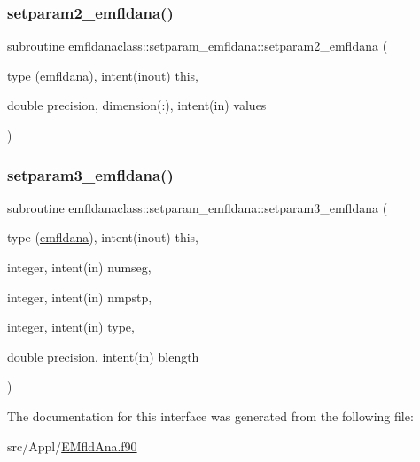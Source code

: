 \mbox{\label{interfaceemfldanaclass_1_1setparam__emfldana_a2a4f3a168c37d3621624b4111867fbe1}} 
\subsubsection{\texorpdfstring{setparam2\_emfldana()}{setparam2\_emfldana()}}
{\footnotesize\ttfamily subroutine emfldanaclass\+::setparam\+\_\+emfldana\+::setparam2\+\_\+emfldana (\begin{DoxyParamCaption}\item[{type (\mbox{\hyperlink{namespaceemfldanaclass_structemfldanaclass_1_1emfldana}{emfldana}}), intent(inout)}]{this,  }\item[{double precision, dimension(\+:), intent(in)}]{values }\end{DoxyParamCaption})}

\mbox{\label{interfaceemfldanaclass_1_1setparam__emfldana_a4e8f06b9117c3766c829eced93c2d474}} 
\subsubsection{\texorpdfstring{setparam3\_emfldana()}{setparam3\_emfldana()}}
{\footnotesize\ttfamily subroutine emfldanaclass\+::setparam\+\_\+emfldana\+::setparam3\+\_\+emfldana (\begin{DoxyParamCaption}\item[{type (\mbox{\hyperlink{namespaceemfldanaclass_structemfldanaclass_1_1emfldana}{emfldana}}), intent(inout)}]{this,  }\item[{integer, intent(in)}]{numseg,  }\item[{integer, intent(in)}]{nmpstp,  }\item[{integer, intent(in)}]{type,  }\item[{double precision, intent(in)}]{blength }\end{DoxyParamCaption})}



The documentation for this interface was generated from the following file\+:\begin{DoxyCompactItemize}
\item 
src/\+Appl/\mbox{\hyperlink{_e_mfld_ana_8f90}{E\+Mfld\+Ana.\+f90}}\end{DoxyCompactItemize}
